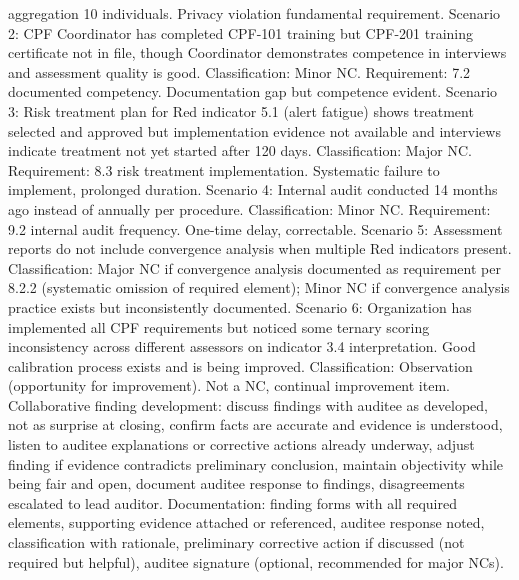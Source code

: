 \documentclass[11pt,a4paper]{article}
\begin{document}
aggregation 10 individuals. Privacy violation fundamental requirement. Scenario 2: CPF Coordinator has completed CPF-101 training but CPF-201 training certificate not in file, though Coordinator demonstrates competence in interviews and assessment quality is good. Classification: Minor NC. Requirement: 7.2 documented competency. Documentation gap but competence evident. Scenario 3: Risk treatment plan for Red indicator 5.1 (alert fatigue) shows treatment selected and approved but implementation evidence not available and interviews indicate treatment not yet started after 120 days. Classification: Major NC. Requirement: 8.3 risk treatment implementation. Systematic failure to implement, prolonged duration. Scenario 4: Internal audit conducted 14 months ago instead of annually per procedure. Classification: Minor NC. Requirement: 9.2 internal audit frequency. One-time delay, correctable. Scenario 5: Assessment reports do not include convergence analysis when multiple Red indicators present. Classification: Major NC if convergence analysis documented as requirement per 8.2.2 (systematic omission of required element); Minor NC if convergence analysis practice exists but inconsistently documented. Scenario 6: Organization has implemented all CPF requirements but noticed some ternary scoring inconsistency across different assessors on indicator 3.4 interpretation. Good calibration process exists and is being improved. Classification: Observation (opportunity for improvement). Not a NC, continual improvement item. Collaborative finding development: discuss findings with auditee as developed, not as surprise at closing, confirm facts are accurate and evidence is understood, listen to auditee explanations or corrective actions already underway, adjust finding if evidence contradicts preliminary conclusion, maintain objectivity while being fair and open, document auditee response to findings, disagreements escalated to lead auditor. Documentation: finding forms with all required elements, supporting evidence attached or referenced, auditee response noted, classification with rationale, preliminary corrective action if discussed (not required but helpful), auditee signature (optional, recommended for major NCs).
\end{document}
